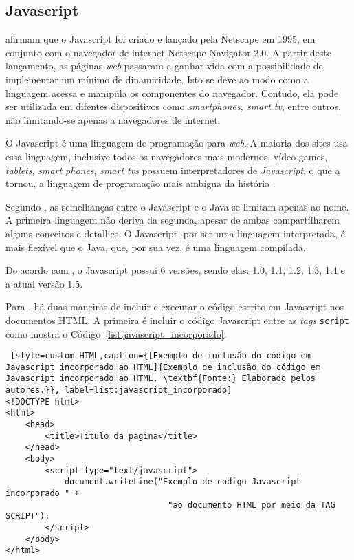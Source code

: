 \subsection{Javascript}

 afirmam que o Javascript foi criado e lançado pela Netscape em 1995, em conjunto com o navegador de internet Netscape Navigator 2.0. A partir deste lançamento, as páginas \textit{web} passaram a ganhar vida com a possibilidade de implementar um mínimo de dinamicidade. Isto se deve ao modo como a linguagem acessa e manipula os componentes do navegador. Contudo, ela pode ser utilizada em difentes dispositivos como \textit{smartphones, smart tv}, entre outros, não limitando-se apenas a navegadores de internet.

O Javascript é uma linguagem de programação para \textit{web}. A maioria dos sites usa essa linguagem, inclusive todos os navegadores mais modernos, vídeo games, \textit{tablets}, \textit{smart phones}, \textit{smart tvs} possuem interpretadores de \textit{Javascript}, o que a tornou, a linguagem de programação mais ambígua da história \cite{flanagan_javascript_definitive_guide}.

Segundo , as semelhanças entre o Javascript e o Java se limitam apenas ao nome. A primeira linguagem não deriva da segunda, apesar de ambas compartilharem alguns conceitos e detalhes. O Javascript, por ser uma linguagem interpretada, é mais flexível que o Java, que, por sua vez, é uma linguagem compilada.

De acordo com , o Javascript possui 6 versões, sendo elas: 1.0, 1.1, 1.2, 1.3, 1.4 e a atual versão 1.5.

Para , há duas maneiras de incluir e executar o código escrito em Javascript nos documentos HTML. A primeira é incluir o código Javascript entre as \textit{tags} \texttt{script} como mostra o Código~\ref{list:javascript_incorporado}. 

\begin{lstlisting} [style=custom_HTML,caption={[Exemplo de inclusão do código em Javascript incorporado ao HTML]{Exemplo de inclusão do código em Javascript incorporado ao HTML. \textbf{Fonte:} Elaborado pelos autores.}}, label=list:javascript_incorporado] 	
<!DOCTYPE html>
<html>
	<head>
		<title>Titulo da pagina</title>
	</head>
	<body>
		<script type="text/javascript">
			document.writeLine("Exemplo de codigo Javascript incorporado " +
								 "ao documento HTML por meio da TAG SCRIPT");
		</script>
	</body>
</html>
\end{lstlisting}

